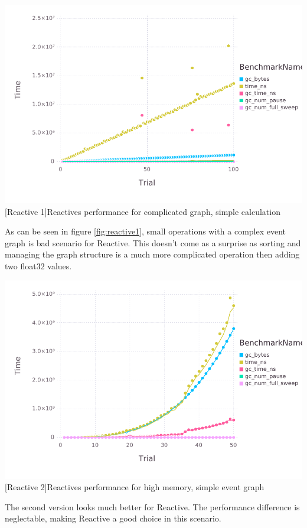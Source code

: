 \begin{minipage}{\linewidth}
    \centering
    \includegraphics[width=0.9\linewidth]{graphics/react_bench2.pdf}
    [Reactive 1]{Reactives performance for complicated graph, simple calculation}
    \label{fig:reactive1}
\end{minipage}
As can be seen in figure \ref{fig:reactive1}, small operations with a complex event graph is bad scenario for Reactive.
This doesn't come as a surprise as sorting and managing the graph structure is a much more complicated operation then adding two float32 values.

\vspace{1em}
\begin{minipage}{\linewidth}
    \centering
    \includegraphics[width=0.9\linewidth]{graphics/react_bench.pdf}
    [Reactive 2]{Reactives performance for high memory, simple event graph}
    \label{fig:reactive2}
\end{minipage}
\vspace{1em}
The second version looks much better for Reactive. The performance difference is neglectable, making Reactive a good choice in this scenario.

